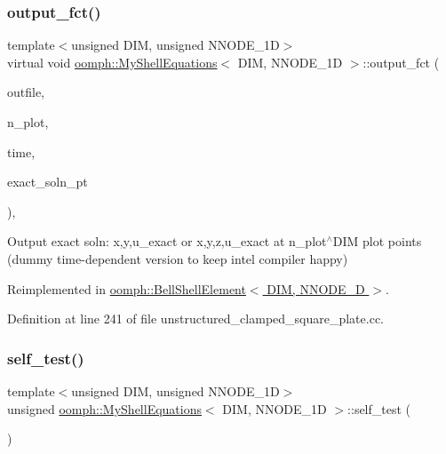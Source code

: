 \subsubsection{\texorpdfstring{output\+\_\+fct()}{output\_fct()}\hspace{0.1cm}{\footnotesize\ttfamily [2/2]}}
{\footnotesize\ttfamily template$<$unsigned D\+IM, unsigned N\+N\+O\+D\+E\+\_\+1D$>$ \\
virtual void \hyperlink{classoomph_1_1MyShellEquations}{oomph\+::\+My\+Shell\+Equations}$<$ D\+IM, N\+N\+O\+D\+E\+\_\+1D $>$\+::output\+\_\+fct (\begin{DoxyParamCaption}\item[{std\+::ostream \&}]{outfile,  }\item[{const unsigned \&}]{n\+\_\+plot,  }\item[{const double \&}]{time,  }\item[{Finite\+Element\+::\+Unsteady\+Exact\+Solution\+Fct\+Pt}]{exact\+\_\+soln\+\_\+pt }\end{DoxyParamCaption})\hspace{0.3cm}{\ttfamily [inline]}, {\ttfamily [virtual]}}



Output exact soln\+: x,y,u\+\_\+exact or x,y,z,u\+\_\+exact at n\+\_\+plot$^\wedge$\+D\+IM plot points (dummy time-\/dependent version to keep intel compiler happy) 



Reimplemented in \hyperlink{classoomph_1_1BellShellElement_a5589f860978d78c64278afdbc72f5f5d}{oomph\+::\+Bell\+Shell\+Element$<$ D\+I\+M, N\+N\+O\+D\+E\+\_\+D $>$}.



Definition at line 241 of file unstructured\+\_\+clamped\+\_\+square\+\_\+plate.\+cc.

\mbox{\label{classoomph_1_1MyShellEquations_ab78a1d617fdd782b3e60ffd89e0c4737}} 
\subsubsection{\texorpdfstring{self\+\_\+test()}{self\_test()}}
{\footnotesize\ttfamily template$<$unsigned D\+IM, unsigned N\+N\+O\+D\+E\+\_\+1D$>$ \\
unsigned \hyperlink{classoomph_1_1MyShellEquations}{oomph\+::\+My\+Shell\+Equations}$<$ D\+IM, N\+N\+O\+D\+E\+\_\+1D $>$\+::self\+\_\+test (\begin{DoxyParamCaption}{ }\end{DoxyParamCaption})}



